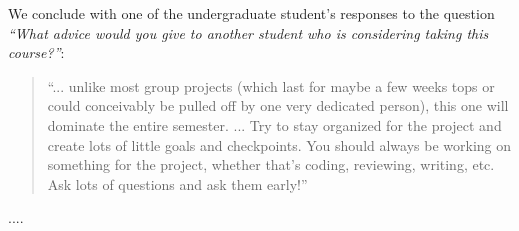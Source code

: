 We conclude with one of the undergraduate student's responses to the question
\emph{``What advice would you give to another student who is considering taking this course?''}:
\begin{quotation}
``... unlike most group projects (which last for maybe a few weeks tops or
could conceivably be pulled off by one very dedicated person), this one will
dominate the entire semester. ... Try to stay organized for the project and
create lots of little goals and checkpoints. You should always be working on
something for the project, whether that's coding, reviewing, writing, etc. Ask
lots of questions and ask them early!''
\end{quotation}
....
